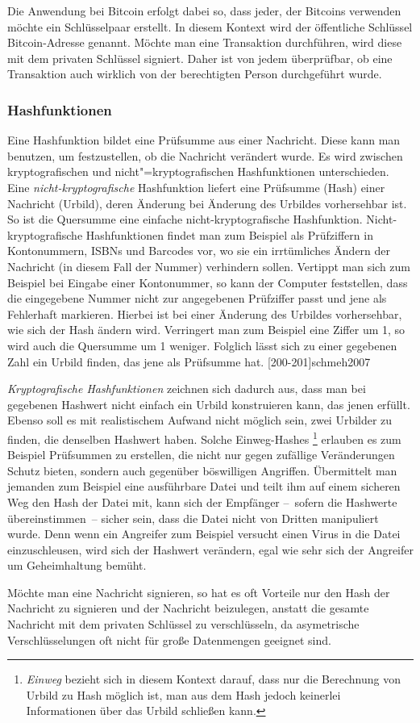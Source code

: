 Die Anwendung bei Bitcoin erfolgt dabei so, dass jeder, der Bitcoins verwenden möchte ein Schlüsselpaar erstellt.
In diesem Kontext wird der öffentliche Schlüssel Bitcoin-Adresse genannt.
Möchte man eine Transaktion durchführen, wird diese mit dem privaten Schlüssel signiert.
Daher ist von jedem überprüfbar, ob eine Transaktion auch wirklich von der berechtigten Person durchgeführt wurde.

\subsubsection{Hashfunktionen}

Eine Hashfunktion bildet eine Prüfsumme aus einer Nachricht.
Diese kann man benutzen, um festzustellen, ob die Nachricht verändert wurde.
Es wird zwischen kryptografischen und nicht"=kryptografischen Hashfunktionen unterschieden.
Eine \emph{nicht-kryptografische} Hashfunktion liefert eine Prüfsumme (Hash) einer Nachricht (Urbild), deren Änderung bei Änderung des Urbildes vorhersehbar ist.
So ist die Quersumme eine einfache nicht-kryptografische Hashfunktion.
Nicht-kryptografische Hashfunktionen findet man zum Beispiel als Prüfziffern in Kontonummern, ISBNs und Barcodes vor, wo sie ein irrtümliches Ändern der Nachricht (in diesem Fall der Nummer) verhindern sollen.
Vertippt man sich zum Beispiel bei Eingabe einer Kontonummer, so kann der Computer feststellen, dass die eingegebene Nummer nicht zur angegebenen Prüfziffer passt und jene als Fehlerhaft markieren.
Hierbei ist bei einer Änderung des Urbildes vorhersehbar, wie sich der Hash ändern wird.
Verringert man zum Beispiel eine Ziffer um 1, so wird auch die Quersumme um 1 weniger.
Folglich lässt sich zu einer gegebenen Zahl ein Urbild finden, das jene als Prüfsumme hat.
[200-201]{schmeh2007}

\emph{Kryptografische Hashfunktionen} zeichnen sich dadurch aus, dass man bei gegebenen Hashwert nicht einfach ein Urbild konstruieren kann, das jenen erfüllt.
Ebenso soll es mit realistischem Aufwand nicht möglich sein, zwei Urbilder zu finden, die denselben Hashwert haben.
Solche Einweg-Hashes%
\footnote{\emph{Einweg} bezieht sich in diesem Kontext darauf, dass nur die Berechnung von Urbild zu Hash möglich ist, man aus dem Hash jedoch keinerlei Informationen über das Urbild schließen kann.}
erlauben es zum Beispiel Prüfsummen zu erstellen, die nicht nur gegen zufällige Veränderungen Schutz bieten, sondern auch gegenüber böswilligen Angriffen.
Übermittelt man jemanden zum Beispiel eine ausführbare Datei und teilt ihm auf einem sicheren Weg den Hash der Datei mit, kann sich der Empfänger --~sofern die Hashwerte übereinstimmen~-- sicher sein, dass die Datei nicht von Dritten manipuliert wurde.
Denn wenn ein Angreifer zum Beispiel versucht einen Virus in die Datei einzuschleusen, wird sich der Hashwert verändern, egal wie sehr sich der Angreifer um Geheimhaltung bemüht.

Möchte man eine Nachricht signieren, so hat es oft Vorteile nur den Hash der Nachricht zu signieren und der Nachricht beizulegen, anstatt die gesamte Nachricht mit dem privaten Schlüssel zu verschlüsseln, da asymetrische Verschlüsselungen oft nicht für große Datenmengen geeignet sind.
